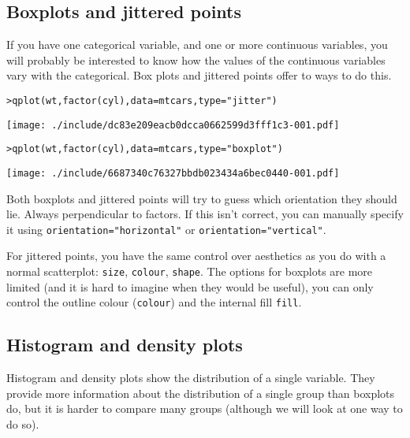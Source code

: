 \subsection{Boxplots and jittered points}\label{sub:boxplot}

If you have one categorical variable, and one or more continuous variables, you will probably be interested to know how the values of the continuous variables vary with the categorical.  Box plots and jittered points offer to ways to do this.  

\begin{alltt}
> qplot(wt, factor(cyl), data = mtcars, type = "jitter")
\end{alltt}
\texttt{[image: ./include/dc83e209eacb0dcca0662599d3fff1c3-001.pdf]}
\begin{alltt}

> qplot(wt, factor(cyl), data = mtcars, type = "boxplot")
\end{alltt}
\texttt{[image: ./include/6687340c76327bbdb023434a6bec0440-001.pdf]}
\begin{alltt}

\end{alltt}%

Both boxplots and jittered points will try to guess which orientation they should lie.  Always perpendicular to factors.  If this isn't correct, you can manually specify it using {\tt orientation="horizontal"} or {\tt orientation="vertical"}.  

For jittered points, you have the same control over aesthetics as you do with a normal scatterplot: {\tt size}, {\tt colour}, {\tt shape}.  The options for boxplots are more limited (and it is hard to imagine when they would be useful), you can only control the outline colour ({\tt colour}) and the internal fill {\tt fill}.

\subsection{Histogram and density plots}\label{sub:density}

Histogram and density plots show the distribution of a single variable.  They provide more information about the distribution of a single group than boxplots do, but it is harder to compare many groups (although we will look at one way to do so).

